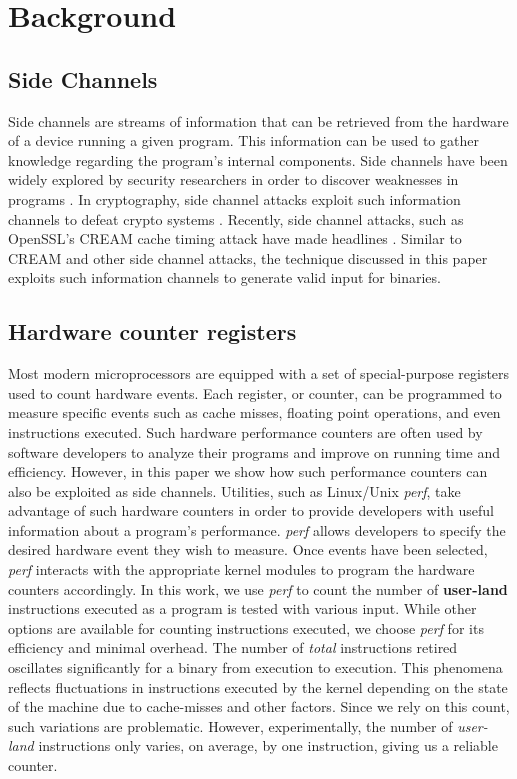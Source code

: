 \documentclass{acm_proc_article-sp}
\begin{document}
\section{Background} \label{background}
\subsection{Side Channels} \label{bg_sidechannels}
Side channels are streams of information that can be retrieved from the hardware of a device running a given program.
This information can be used to gather knowledge regarding the program's internal components.
Side channels have been widely explored by security researchers in order to discover weaknesses in programs \cite{weinbergside, schindler2002combined, genkin2014rsa, genkinstealing}.
In cryptography, side channel attacks exploit such information channels to defeat crypto systems \cite{zhou2005side, black2002black, okeya2006side}.
Recently, side channel attacks, such as OpenSSL's CREAM cache timing attack have made headlines \cite{creamssl}.
Similar to CREAM and other side channel attacks, the technique discussed in this paper exploits such information channels to generate valid input for binaries.
\subsection{Hardware counter registers} \label{bg_hardwarereg}
Most modern microprocessors are equipped with a set of special-purpose registers used to count hardware events.
Each register, or counter, can be programmed to measure specific events such as cache misses, floating point operations, and even instructions executed.
Such hardware performance counters are often used by software developers to analyze their programs and improve on running time and efficiency.
However, in this paper we show how such performance counters can also be exploited as side channels.
Utilities, such as Linux/Unix \textit{perf}, take advantage of such hardware counters in order to provide developers with useful information about a program's performance.
\textit{perf} allows developers to specify the desired hardware event they wish to measure.
Once events have been selected, \textit{perf} interacts with the appropriate kernel modules to program the hardware counters accordingly.
In this work, we use \textit{perf} to count the number of \textbf{user-land} instructions executed as a program is tested with various input.
While other options are available for counting instructions executed, we choose \textit{perf} for its efficiency and minimal overhead.
The number of \textit{total} instructions retired oscillates significantly for a binary from execution to execution.
This phenomena reflects fluctuations in instructions executed by the kernel depending on the state of the machine due to cache-misses and other factors.
Since we rely on this count, such variations are problematic.
However, experimentally, the number of \textit{user-land} instructions only varies, on average, by one instruction, giving us a reliable counter.
\end{document}
